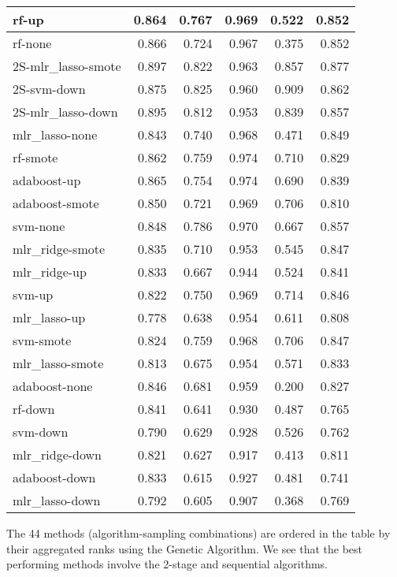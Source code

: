 \documentclass[
]{report}
\renewcommand{\bibname}{References}
\begin{document}
\begin{table}
\begin{tabular}[t]{l|r|r|r|r|r}
\hline
rf-up & 0.864 & 0.767 & 0.969 & 0.522 & 0.852\\
\hline
rf-none & 0.866 & 0.724 & 0.967 & 0.375 & 0.852\\
\hline
2S-mlr\_lasso-smote & 0.897 & 0.822 & 0.963 & 0.857 & 0.877\\
\hline
2S-svm-down & 0.875 & 0.825 & 0.960 & 0.909 & 0.862\\
\hline
2S-mlr\_lasso-down & 0.895 & 0.812 & 0.953 & 0.839 & 0.857\\
\hline
mlr\_lasso-none & 0.843 & 0.740 & 0.968 & 0.471 & 0.849\\
\hline
rf-smote & 0.862 & 0.759 & 0.974 & 0.710 & 0.829\\
\hline
adaboost-up & 0.865 & 0.754 & 0.974 & 0.690 & 0.839\\
\hline
adaboost-smote & 0.850 & 0.721 & 0.969 & 0.706 & 0.810\\
\hline
svm-none & 0.848 & 0.786 & 0.970 & 0.667 & 0.857\\
\hline
mlr\_ridge-smote & 0.835 & 0.710 & 0.953 & 0.545 & 0.847\\
\hline
mlr\_ridge-up & 0.833 & 0.667 & 0.944 & 0.524 & 0.841\\
\hline
svm-up & 0.822 & 0.750 & 0.969 & 0.714 & 0.846\\
\hline
mlr\_lasso-up & 0.778 & 0.638 & 0.954 & 0.611 & 0.808\\
\hline
svm-smote & 0.824 & 0.759 & 0.968 & 0.706 & 0.847\\
\hline
mlr\_lasso-smote & 0.813 & 0.675 & 0.954 & 0.571 & 0.833\\
\hline
adaboost-none & 0.846 & 0.681 & 0.959 & 0.200 & 0.827\\
\hline
rf-down & 0.841 & 0.641 & 0.930 & 0.487 & 0.765\\
\hline
svm-down & 0.790 & 0.629 & 0.928 & 0.526 & 0.762\\
\hline
mlr\_ridge-down & 0.821 & 0.627 & 0.917 & 0.413 & 0.811\\
\hline
adaboost-down & 0.833 & 0.615 & 0.927 & 0.481 & 0.741\\
\hline
mlr\_lasso-down & 0.792 & 0.605 & 0.907 & 0.368 & 0.769\\
\hline
\end{tabular}
\end{table}

The 44 methods (algorithm-sampling combinations) are ordered in the table by their aggregated ranks using the Genetic Algorithm. We see that the best performing methods involve the 2-stage and sequential algorithms.

  
\addcontentsline{toc}{chapter}{\bibname}
\end{document}
